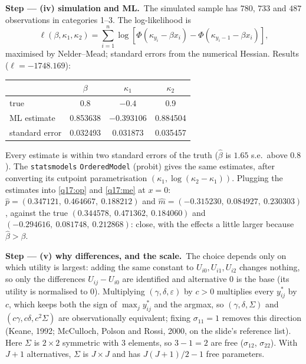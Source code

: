 \documentclass[11pt,a4paper]{article}
\numberwithin{equation}{questao}
\newcommand{\passo}[2]{\par\smallskip\noindent\textbf{Step --- #1.}~#2}
\begin{document}
\begin{sol}
\passo{(iv) simulation and ML}{The simulated sample has $780$, $733$ and $487$ observations in categories 1--3. The
log-likelihood is
\begin{equation}
\ell(\beta,\kappa_1,\kappa_2)=\sum_{i=1}^n\log\left[\Phi(\kappa_{y_i}-\beta x_i)-\Phi(\kappa_{y_i-1}-\beta x_i)\right], \label{q17:ll}
\end{equation}
maximised by Nelder--Mead; standard errors from the numerical Hessian. Results ($\ell=-1748.169$):
\begin{center}\small
\begin{tabular}{lccc}
\toprule
 & $\beta$ & $\kappa_1$ & $\kappa_2$\\
\midrule
true & 0.8 & $-0.4$ & 0.9\\
ML estimate & 0.853638 & $-0.393106$ & 0.884504\\
standard error & 0.032493 & 0.031873 & 0.035457\\
\bottomrule
\end{tabular}
\end{center}
Every estimate is within two standard errors of the truth ($\hat\beta$ is $1.65$ s.e.\ above $0.8$). The
\texttt{statsmodels} \texttt{OrderedModel} (probit) gives the same estimates, after converting its cutpoint
parametrisation $(\kappa_1,\log(\kappa_2-\kappa_1))$. Plugging the estimates into \eqref{q17:op} and \eqref{q17:me} at $x=0$:
$\hat p=(0.347121,\ 0.464667,\ 0.188212)$ and $\hat m=(-0.315230,\ 0.084927,\ 0.230303)$, against the true
$(0.344578,\ 0.471362,\ 0.184060)$ and $(-0.294616,\ 0.081748,\ 0.212868)$: close, with the effects a little larger
because $\hat\beta>\beta$.}

\passo{(v) why differences, and the scale}{The choice depends only on which utility is largest: adding the same
constant to $U_{i0},U_{i1},U_{i2}$ changes nothing, so only the differences $U_{ij}-U_{i0}$ are identified and
alternative 0 is the base (its utility is normalised to 0). Multiplying $(\gamma,\delta,\varepsilon)$ by $c>0$ multiplies
every $y_{ij}^*$ by $c$, which keeps both the sign of $\max_j y_{ij}^*$ and the argmax, so $(\gamma,\delta,\Sigma)$ and
$(c\gamma,c\delta,c^2\Sigma)$ are observationally equivalent; fixing $\sigma_{11}=1$ removes this direction (Keane,
1992; McCulloch, Polson and Rossi, 2000, on the slide's reference list). Here $\Sigma$ is $2\times2$ symmetric with
$3$ elements, so $3-1=2$ are free ($\sigma_{12}$, $\sigma_{22}$). With $J+1$ alternatives, $\Sigma$ is $J\times J$ and has
$J(J+1)/2-1$ free parameters.}


\end{sol}
\end{document}
